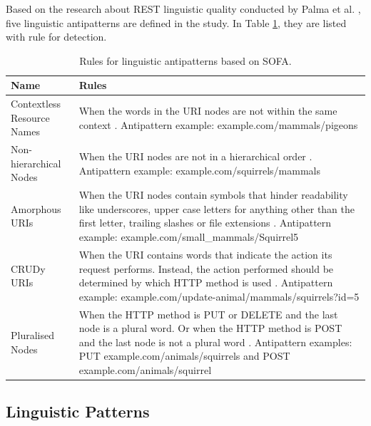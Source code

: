 Based on the research about REST linguistic quality conducted by Palma et al. \cite{linguistic}, five linguistic antipatterns are defined in the study. In Table \ref{tab:Rulesforlinguisticantipatterns}, they are listed with rule for detection.
\begin{center}
\begin{table}[!ht]
\small
\begin{tabular}{|p{30mm}|p{105mm}|}
\hline \textbf{Name} & \textbf{Rules} \\
\hline 
Contextless Resource Names &
When the words in the URI nodes are not within the same context \cite{linguistic}. \newline Antipattern example: example.com/mammals/pigeons\\ \hline
Non-hierarchical Nodes &
When the URI nodes are not in a hierarchical order \cite{linguistic}. \newline Antipattern example: example.com/squirrels/mammals\\ \hline
Amorphous URIs &
When the URI nodes contain symbols that hinder readability like underscores, upper case letters for anything other than the first letter, trailing slashes or file extensions \cite{linguistic}. \newline Antipattern example: 
example.com/small\_mammals/Squirrel5\\ \hline
CRUDy URIs &
When the URI contains words that indicate the action its request performs. Instead, the action performed should be determined by which HTTP method is used \cite{linguistic}. \newline Antipattern example: 
example.com/update-animal/mammals/squirrels?id=5\\ \hline
Pluralised Nodes
&
When the HTTP method is PUT or DELETE and the last node is a plural word. Or when the HTTP method is POST and the last node is not a plural word \cite{linguistic}. \newline Antipattern examples: PUT example.com/animals/squirrels and POST example.com/animals/squirrel

\\ \hline
\end{tabular}
 \caption{Rules for linguistic antipatterns based on SOFA.}
 \label{tab:Rulesforlinguisticantipatterns}
\end{table}
\end{center}

\clearpage

\subsection{Linguistic Patterns}

